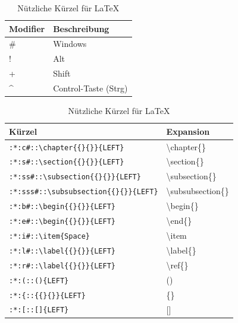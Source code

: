 \documentclass[ngerman]{dtk}%
\begin{document}
\begin{table}[h]
\begin{center}
\begin{tabular}{p{6.25cm}p{4cm}}   \\ \toprule
Modifier & Beschreibung \\ \midrule
\# & Windows \\
! & Alt \\
+ & Shift \\
\textasciicircum & Control-Taste (Strg) \\
\bottomrule \end{tabular}
\caption{Nützliche Kürzel für \LaTeX} \label{tab:mods}
\end{center}
\end{table}


\begin{longtable}{p{6.25cm}p{4cm}} \caption[Verschiedene Kürzel]{Nützliche Kürzel für \LaTeX} \label{tab:ahktw}  \\ \toprule
Kürzel & Expansion \\ \midrule
\verb|:*:c#::\chapter{{}{}}{LEFT}| & \textbackslash chapter\{\textvisiblespace \}\\
\verb|:*:s#::\section{{}{}}{LEFT}| & \textbackslash section\{\textvisiblespace \}\\
\verb|:*:ss#::\subsection{{}{}}{LEFT}| & \textbackslash subsection\{\textvisiblespace \}\\
\verb|:*:sss#::\subsubsection{{}{}}{LEFT}| & \textbackslash subsubsection\{\textvisiblespace \}\\
\verb|:*:b#::\begin{{}{}}{LEFT}| & \textbackslash begin\{\textvisiblespace \} \\
\verb|:*:e#::\begin{{}{}}{LEFT}| & \textbackslash end\{\textvisiblespace \} \\
\verb|:*:i#::\item{Space}| & \textbackslash item \textvisiblespace \\
\verb|:*:l#::\label{{}{}}{LEFT}| & \textbackslash label\{\textvisiblespace\} \\
\verb|:*:r#::\label{{}{}}{LEFT}| & \textbackslash ref\{\textvisiblespace\} \\
\verb|:*:(::(){LEFT}| & (\textvisiblespace) \\
\verb|:*:{::{{}{}}{LEFT}| & \{\textvisiblespace\} \\ 
\verb|:*:[::[]{LEFT}| & [\textvisiblespace] \\
\bottomrule \end{longtable}
\end{document}
